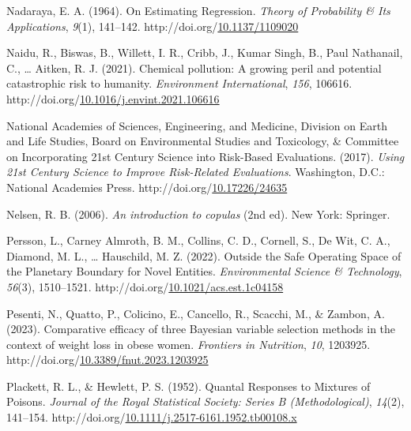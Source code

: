 \documentclass[12pt, twoside]{amherstthesis}
\newenvironment{CSLReferences}[2]%
  {}%
  {\par}
\begin{document}
\begin{CSLReferences}{1}{0}
\leavevmode{}%
Nadaraya, E. A. (1964). On {Estimating} {Regression}. \emph{Theory of Probability \& Its Applications}, \emph{9}(1), 141--142. http://doi.org/\href{https://doi.org/10.1137/1109020}{10.1137/1109020}

\leavevmode{}%
Naidu, R., Biswas, B., Willett, I. R., Cribb, J., Kumar Singh, B., Paul Nathanail, C., \ldots{} Aitken, R. J. (2021). Chemical pollution: {A} growing peril and potential catastrophic risk to humanity. \emph{Environment International}, \emph{156}, 106616. http://doi.org/\href{https://doi.org/10.1016/j.envint.2021.106616}{10.1016/j.envint.2021.106616}

\leavevmode{}%
National Academies of Sciences, Engineering, and Medicine, Division on Earth and Life Studies, Board on Environmental Studies and Toxicology, \& Committee on Incorporating 21st Century Science into Risk-Based Evaluations. (2017). \emph{Using 21st {Century} {Science} to {Improve} {Risk}-{Related} {Evaluations}}. Washington, D.C.: National Academies Press. http://doi.org/\href{https://doi.org/10.17226/24635}{10.17226/24635}

\leavevmode{}%
Nelsen, R. B. (2006). \emph{An introduction to copulas} (2nd ed). New York: Springer.

\leavevmode{}%
Persson, L., Carney Almroth, B. M., Collins, C. D., Cornell, S., De Wit, C. A., Diamond, M. L., \ldots{} Hauschild, M. Z. (2022). Outside the {Safe} {Operating} {Space} of the {Planetary} {Boundary} for {Novel} {Entities}. \emph{Environmental Science \& Technology}, \emph{56}(3), 1510--1521. http://doi.org/\href{https://doi.org/10.1021/acs.est.1c04158}{10.1021/acs.est.1c04158}

\leavevmode{}%
Pesenti, N., Quatto, P., Colicino, E., Cancello, R., Scacchi, M., \& Zambon, A. (2023). Comparative efficacy of three {Bayesian} variable selection methods in the context of weight loss in obese women. \emph{Frontiers in Nutrition}, \emph{10}, 1203925. http://doi.org/\href{https://doi.org/10.3389/fnut.2023.1203925}{10.3389/fnut.2023.1203925}

\leavevmode{}%
Plackett, R. L., \& Hewlett, P. S. (1952). Quantal {Responses} to {Mixtures} of {Poisons}. \emph{Journal of the Royal Statistical Society: Series B (Methodological)}, \emph{14}(2), 141--154. http://doi.org/\href{https://doi.org/10.1111/j.2517-6161.1952.tb00108.x}{10.1111/j.2517-6161.1952.tb00108.x}


\end{CSLReferences}
\end{document}
